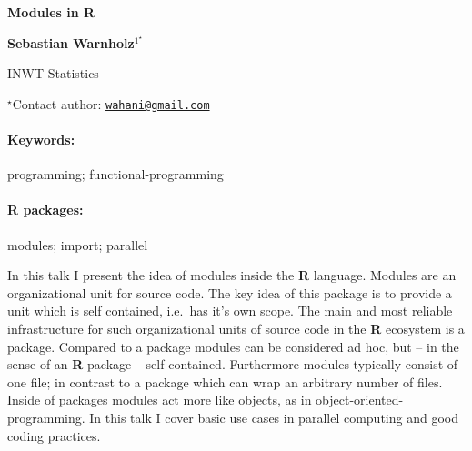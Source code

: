 \documentclass[11pt, a4paper]{article}
\renewcommand{\title}[1]{\begin{center}{\bf \LARGE #1}\end{center}}
\newcommand{\keywords}{\paragraph{Keywords:}}
\newcommand{\packages}{\paragraph{R packages:}}
\begin{document}
\pagestyle{empty}

\title{Modules in R}

\begin{center}
  {\bf Sebastian Warnholz$^{1^\star}$}
\end{center}

\vskip 0.3cm

\begin{affiliations}
\begin{enumerate}
\begin{minipage}{0.915\textwidth}
\centering
\item INWT-Statistics \\[-2pt]
\end{minipage}
\end{enumerate}
$^\star$Contact author: \href{mailto:wahani@gmail.com}{\nolinkurl{wahani@gmail.com}}\\
\end{affiliations}

\vskip 0.5cm

\begin{minipage}{0.915\textwidth}
\keywords programming; functional-programming
\packages modules; import; parallel
\end{minipage}

\vskip 0.8cm

In this talk I present the idea of modules inside the \textbf{R}
language. Modules are an organizational unit for source code. The key
idea of this package is to provide a unit which is self contained,
i.e.~has it's own scope. The main and most reliable infrastructure for
such organizational units of source code in the \textbf{R} ecosystem is
a package. Compared to a package modules can be considered ad hoc, but
-- in the sense of an \textbf{R} package -- self contained. Furthermore
modules typically consist of one file; in contrast to a package which
can wrap an arbitrary number of files. Inside of packages modules act
more like objects, as in object-oriented-programming. In this talk I
cover basic use cases in parallel computing and good coding practices.
\end{document}

